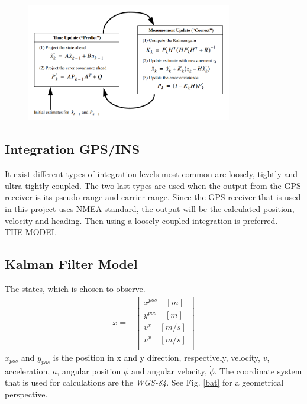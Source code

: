 \begin{figure}[H]
\centering
\includegraphics[width=0.8\textwidth]{kalman_algo}
\caption{}
\label{kalman}
\end{figure}

\subsection*{Integration GPS/INS}
It exist different types of integration levels most common are loosely, tightly and ultra-tightly coupled. The two last types are used when the output from the GPS receiver is its pseudo-range and carrier-range. Since the GPS receiver that is used in this project uses NMEA standard, the output will be the calculated position, velocity and heading. Then using a loosely coupled integration is preferred.\\
THE MODEL \\ 

\subsection*{Kalman Filter Model}
The states, which is chosen to observe.
\begin{align}
x=&
\begin{bmatrix}
x^{pos}\quad[m]\\
y^{pos}\quad[m]\\
v^{x}\quad[m/s]\\
v^{x}\quad[m/s]\\
\end{bmatrix}
\end{align}
$x_{pos}$ and $y_{pos}$ is the position in x and y direction, respectively, velocity, $v$, acceleration, $a$, angular position $\phi$ and angular velocity, $\dot{\phi}$. The coordinate system that is used for calculations are the \emph{WGS-84}. See Fig. \ref{bat} for a geometrical perspective.


